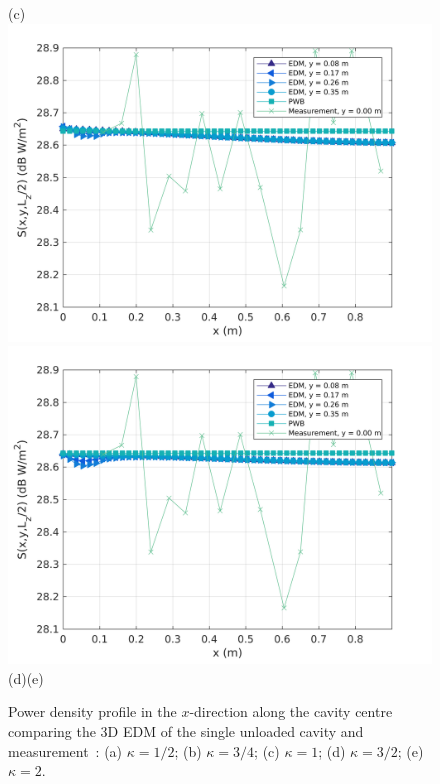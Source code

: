 \documentclass[a4paper]{article}
\numberwithin{equation}{section}
\begin{document}
\begin{figure}[hp]
\begin{center}
{\footnotesize (c)}\\
\includegraphics[width=0.49\linewidth]{figures/SDM_3D_SU_PowerDensityProfileXMeas_JX_k1_5}
\includegraphics[width=0.49\linewidth]{figures/SDM_3D_SU_PowerDensityProfileXMeas_JX_k2_0}\\
{\footnotesize (d)\hspace{75mm}(e)}\\
\vspace{-2mm}
\caption{\label{fg:measprofssuk} Power density profile in the $x$-direction along the cavity centre comparing
the 3D EDM of the single unloaded cavity and measurement~\citep{Flintoft2017b}: (a) $\kappa=1/2$; (b) $\kappa=3/4$;
(c) $\kappa=1$; (d) $\kappa=3/2$; (e) $\kappa=2$.}
\end{center}
\end{figure}
\end{document}
